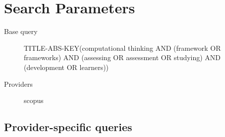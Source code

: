 \documentclass{article}
\begin{document}
\section{Search Parameters}

\begin{description}
\item[Base query] TITLE-ABS-KEY(\textquotedbl{}computational thinking\textquotedbl{} AND (framework OR frameworks) AND (assessing OR assessment OR studying) AND (development OR learners))
\item[Providers] scopus
\end{description}

\subsection{Provider-specific queries}
\end{document}
